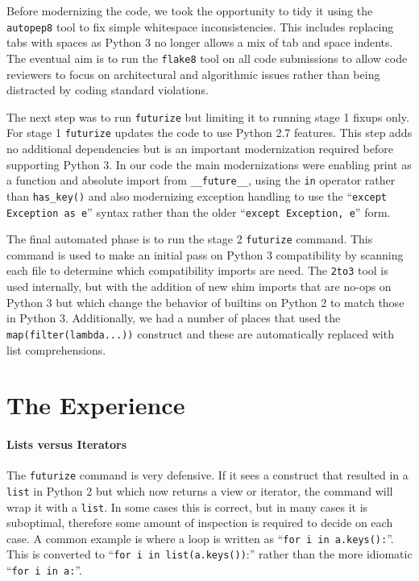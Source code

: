 \documentclass[11pt,twoside]{article}
\begin{document}
Before modernizing the code, we took the opportunity to tidy it using the \texttt{autopep8} tool to fix simple whitespace inconsistencies.
This includes replacing tabs with spaces as Python 3 no longer allows a mix of tab and space indents.
The eventual aim is to run the \texttt{flake8} tool on all code submissions to allow code reviewers to focus on architectural and algorithmic issues rather than being distracted by coding standard violations.

The next step was to run \texttt{futurize} but limiting it to running stage 1 fixups only.
For stage 1 \texttt{futurize} updates the code to use Python 2.7 features.
This step adds no additional dependencies but is an important modernization required before supporting Python 3.
In our code the main modernizations were enabling print as a function and absolute import from \texttt{\_\_future\_\_}, using the \texttt{in} operator rather than \texttt{has\_key()} and also modernizing exception handling to use the ``\texttt{except Exception as e}'' syntax rather than the older ``\texttt{except Exception, e}'' form.

The final automated phase is to run the stage 2 \texttt{futurize} command.
This command is used to make an initial pass on Python 3 compatibility by scanning each file to determine which compatibility imports are need.
The \texttt{2to3} tool is used internally, but with the addition of new shim imports that are no-ops on Python 3 but which change the behavior of builtins on Python 2 to match those in Python 3.
Additionally, we had a number of places that used the \texttt{map(filter(lambda...))} construct and these are automatically replaced with list comprehensions.

\section{The Experience}

\paragraph{Lists versus Iterators}

The \texttt{futurize} command is very defensive.
If it sees a construct that resulted in a \texttt{list} in Python 2 but which now returns a view or iterator, the command will wrap it with a \texttt{list}.
In some cases this is correct, but in many cases it is suboptimal, therefore some amount of inspection is required to decide on each case.
A common example is where a loop is written as ``\texttt{for i in a.keys():}''.
This is converted to ``\texttt{for i in list(a.keys())}:'' rather than the more idiomatic ``\texttt{for i in a:}''.
\end{document}
